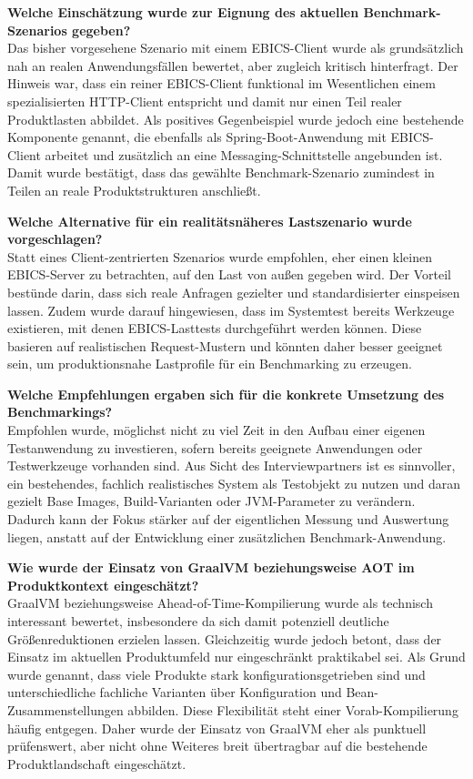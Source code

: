 \begin{linenumbers}
	\textbf{Welche Einschätzung wurde zur Eignung des aktuellen Benchmark-Szenarios gegeben?}\\
	Das bisher vorgesehene Szenario mit einem EBICS-Client wurde als grundsätzlich nah an realen Anwendungsfällen bewertet, aber zugleich kritisch hinterfragt. Der Hinweis war, dass ein reiner EBICS-Client funktional im Wesentlichen einem spezialisierten HTTP-Client entspricht und damit nur einen Teil realer Produktlasten abbildet. Als positives Gegenbeispiel wurde jedoch eine bestehende Komponente genannt, die ebenfalls als Spring-Boot-Anwendung mit EBICS-Client arbeitet und zusätzlich an eine Messaging-Schnittstelle angebunden ist. Damit wurde bestätigt, dass das gewählte Benchmark-Szenario zumindest in Teilen an reale Produktstrukturen anschließt.

	\textbf{Welche Alternative für ein realitätsnäheres Lastszenario wurde vorgeschlagen?}\\
	Statt eines Client-zentrierten Szenarios wurde empfohlen, eher einen kleinen EBICS-Server zu betrachten, auf den Last von außen gegeben wird. Der Vorteil bestünde darin, dass sich reale Anfragen gezielter und standardisierter einspeisen lassen. Zudem wurde darauf hingewiesen, dass im Systemtest bereits Werkzeuge existieren, mit denen EBICS-Lasttests durchgeführt werden können. Diese basieren auf realistischen Request-Mustern und könnten daher besser geeignet sein, um produktionsnahe Lastprofile für ein Benchmarking zu erzeugen.

	\textbf{Welche Empfehlungen ergaben sich für die konkrete Umsetzung des Benchmarkings?}\\
	Empfohlen wurde, möglichst nicht zu viel Zeit in den Aufbau einer eigenen Testanwendung zu investieren, sofern bereits geeignete Anwendungen oder Testwerkzeuge vorhanden sind. Aus Sicht des Interviewpartners ist es sinnvoller, ein bestehendes, fachlich realistisches System als Testobjekt zu nutzen und daran gezielt Base Images, Build-Varianten oder JVM-Parameter zu verändern. Dadurch kann der Fokus stärker auf der eigentlichen Messung und Auswertung liegen, anstatt auf der Entwicklung einer zusätzlichen Benchmark-Anwendung.

	\textbf{Wie wurde der Einsatz von GraalVM beziehungsweise AOT im Produktkontext eingeschätzt?}\\
	GraalVM beziehungsweise Ahead-of-Time-Kompilierung wurde als technisch interessant bewertet, insbesondere da sich damit potenziell deutliche Größenreduktionen erzielen lassen. Gleichzeitig wurde jedoch betont, dass der Einsatz im aktuellen Produktumfeld nur eingeschränkt praktikabel sei. Als Grund wurde genannt, dass viele Produkte stark konfigurationsgetrieben sind und unterschiedliche fachliche Varianten über Konfiguration und Bean-Zusammenstellungen abbilden. Diese Flexibilität steht einer Vorab-Kompilierung häufig entgegen. Daher wurde der Einsatz von GraalVM eher als punktuell prüfenswert, aber nicht ohne Weiteres breit übertragbar auf die bestehende Produktlandschaft eingeschätzt.

\end{linenumbers}
